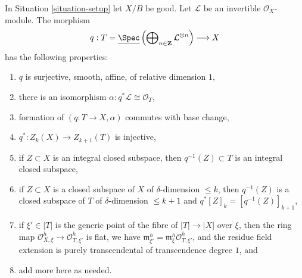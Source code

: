 \begin{lemma}
\label{lemma-Gm-torsor}
In Situation \ref{situation-setup} let $X/B$ be good.
Let $\mathcal{L}$ be an invertible $\mathcal{O}_X$-module.
The morphism
$$
q :
T = \underline{\Spec}\left(
\bigoplus\nolimits_{n \in \mathbf{Z}} \mathcal{L}^{\otimes n}\right)
\longrightarrow
X
$$
has the following properties:
\begin{enumerate}
\item $q$ is surjective, smooth, affine, of relative dimension $1$,
\item there is an isomorphism $\alpha : q^*\mathcal{L} \cong \mathcal{O}_T$,
\item formation of $(q : T \to X, \alpha)$ commutes with base change,
\item $q^* : Z_k(X) \to Z_{k + 1}(T)$ is injective,
\item if $Z \subset X$ is an integral closed subspace, then
$q^{-1}(Z) \subset T$ is an integral closed subspace,
\item if $Z \subset X$ is a closed subspace of $X$
of $\delta$-dimension $\leq k$, then $q^{-1}(Z)$ is a closed subspace of $T$
of $\delta$-dimension $\leq k + 1$ and
$q^*[Z]_k = [q^{-1}(Z)]_{k + 1}$,
\item if $\xi' \in |T|$ is the generic point of the fibre of $|T| \to |X|$
over $\xi$, then the ring map
$\mathcal{O}_{X, \xi}^h \to \mathcal{O}_{T, \xi'}^h$ is flat,
we have $\mathfrak m_{\xi'}^h = \mathfrak m_\xi^h \mathcal{O}_{T, \xi'}^h$, and
the residue field extension is purely transcendental of
transcendence degree $1$, and
\item add more here as needed.
\end{enumerate}
\end{lemma}

